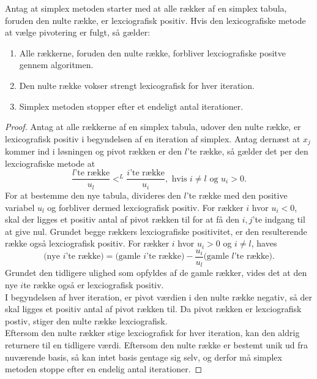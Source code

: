 \begin{thm}{}{}
Antag at simplex metoden starter med at alle rækker af en simplex tabula, foruden den nulte række, er lexciografisk positiv. Hvis den lexicografiske metode at vælge pivotering er fulgt, så gælder:
\begin{enumerate}[label=(\alph*)]
\item Alle rækkerne, foruden den nulte række, forbliver lexciografiske positve gennem algoritmen.
\item Den nulte række vokser strengt lexicografisk for hver iteration.
\item Simplex metoden stopper efter et endeligt antal iterationer. 
\end{enumerate}
\end{thm}
%
\begin{proof}
Antag at alle rækkerne af en simplex tabula, udover den nulte række, er lexicografisk positiv i begyndelsen af en iteration af simplex. 
Antag dernæst at $x_j$ kommer ind i løsningen og pivot rækken er den $l$'te række, så gælder det per den lexciografiske metode at
$$\dfrac{l\text{'te række}}{u_l}<^L \dfrac{i\text{'te række}}{u_i}, \text{  hvis } i\neq l \text{ og }u_i>0.$$
For at bestemme den nye tabula, divideres den $l$'te række med den positive variabel $u_l$ og forbliver dermed lexciografisk positiv.
For rækker $i$ hvor $u_i<0$, skal der ligges et positiv antal af pivot rækken til for at få den $i,j$'te indgang til at give nul. 
Grundet begge rækkers lexciografiske positivitet, er den resulterende række også lexciografisk positiv.
For rækker $i$ hvor $u_i>0$ og $i\neq l$, haves
$$\text{(nye }i\text{'te række)}=\text{(gamle }i\text{'te række)}-\dfrac{u_i}{u_l}\text{(gamle }l\text{'te række)}.$$
Grundet den tidligere ulighed som opfyldes af de gamle rækker, vides det at den nye $i$te række også er lexciografisk positiv.
\\
I begyndelsen af hver iteration, er pivot værdien i den nulte række negativ, så der skal ligges et positiv antal af pivot rækken til. 
Da pivot rækken er lexciografisk postiv, stiger den nulte række lexciografisk.
\\
Eftersom den nulte rækker stige lexciografisk for hver iteration, kan den aldrig returnere til en tidligere værdi.
Eftersom den nulte række er bestemt unik ud fra nuværende basis, så kan intet basis gentage sig selv, og derfor må simplex metoden stoppe efter en endelig antal iterationer.
\end{proof}
%
%
%
%